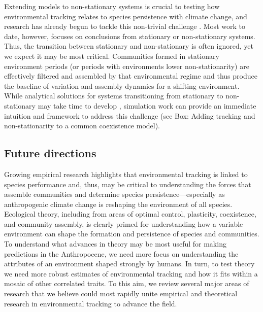 \documentclass[11pt,letterpaper]{article}
\newcommand{\R}[1]{\label{#1}\linelabel{#1}}
\begin{document}
Extending models to non-stationary systems is crucial to testing how environmental tracking relates to species persistence with climate change, and research has already begun to tackle this non-trivial challenge \citep{chessonnonstat,legault2019,volkerass}. Most work to date, however, focuses on conclusions from stationary or non-stationary systems. Thus, the transition between stationary and non-stationary is often ignored, yet we expect it may be most critical. Communities formed in stationary environment periods (or periods with environments lower non-stationarity) are effectively filtered and assembled by that environmental regime and thus produce the baseline of variation and assembly dynamics for a shifting environment. While analytical solutions for systems transitioning from stationary to non-stationary may take time to develop \citep{chessonnonstat}, simulation work can provide an immediate intuition and framework to address this challenge (see Box: Adding tracking and non-stationarity to a common coexistence model). \R{sectionmutisppend}

\subsection{Future directions}

Growing empirical research highlights that environmental tracking is linked to species performance and, thus, may be critical to understanding the forces that assemble communities and determine species persistence---especially as anthropogenic climate change is reshaping the environment of all species. Ecological theory, including from areas of optimal control, plasticity, coexistence, and community assembly, is clearly primed for understanding how a variable environment can shape the formation and persistence of species and communities. To understand what advances in theory may be most useful for making predictions in the Anthropocene, we need more focus on understanding the attributes of an environment shaped strongly by humans. In turn, to test theory we need more robust estimates of environmental tracking and how it fits within a mosaic of other correlated traits. To this aim, we review several major areas of research that we believe could most rapidly unite empirical and theoretical research in environmental tracking to advance the field.\\ %
\end{document}
